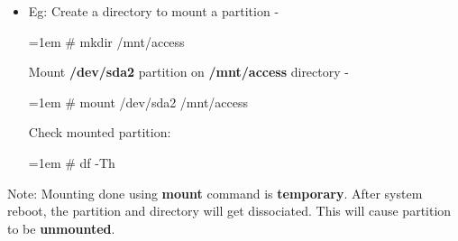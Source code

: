 \begin{flushleft}
\begin{itemize}
		\item Eg: Create a directory to mount a partition -
		\bigskip
		\begin{tcolorbox}[breakable,notitle,boxrule=-0pt,colback=black,colframe=black]
			\color{green}
			\font=1em
			\# mkdir /mnt/access
			\font=4pt
		\end{tcolorbox}
		Mount \textbf{/dev/sda2} partition on \textbf{/mnt/access} directory -
		\bigskip
		\begin{tcolorbox}[breakable,notitle,boxrule=-0pt,colback=black,colframe=black]
			\color{green}
			\font=1em
			\# mount /dev/sda2 /mnt/access
			\font=4pt
		\end{tcolorbox}
		Check mounted partition:
		\bigskip
		\begin{tcolorbox}[breakable,notitle,boxrule=-0pt,colback=black,colframe=black]
			\color{green}
			\font=1em
			\# df -Th
			\font=4pt
		\end{tcolorbox}
		
	\end{itemize}
	\bigskip
	\begin{tcolorbox}[breakable,notitle,boxrule=1pt,colback=yellow,colframe=yellow]
		\color{black}
		Note: Mounting done using \textbf{mount} command is \textbf{temporary}. After system reboot, the partition and directory will get dissociated. This will cause partition to be \textbf{unmounted}.
	\end{tcolorbox}
	
	
	
\end{flushleft}

\newpage


